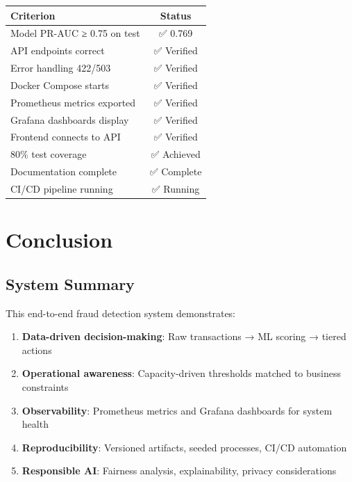 \documentclass[12pt,a4paper]{article}
\begin{document}
\begin{table}[H]
\centering
\small
\begin{tabular}{|l|c|}
\hline
\textbf{Criterion} & \textbf{Status} \\
\hline
Model PR-AUC ≥ 0.75 on test & ✅ 0.769 \\
API endpoints correct & ✅ Verified \\
Error handling 422/503 & ✅ Verified \\
Docker Compose starts & ✅ Verified \\
Prometheus metrics exported & ✅ Verified \\
Grafana dashboards display & ✅ Verified \\
Frontend connects to API & ✅ Verified \\
80\% test coverage & ✅ Achieved \\
Documentation complete & ✅ Complete \\
CI/CD pipeline running & ✅ Running \\
\hline
\end{tabular}
\end{table}

\section{Conclusion}

\subsection{System Summary}

This end-to-end fraud detection system demonstrates:

\begin{enumerate}
    \item \textbf{Data-driven decision-making}: Raw transactions → ML scoring → tiered actions
    \item \textbf{Operational awareness}: Capacity-driven thresholds matched to business constraints
    \item \textbf{Observability}: Prometheus metrics and Grafana dashboards for system health
    \item \textbf{Reproducibility}: Versioned artifacts, seeded processes, CI/CD automation
    \item \textbf{Responsible AI}: Fairness analysis, explainability, privacy considerations
\end{enumerate}
\end{document}
